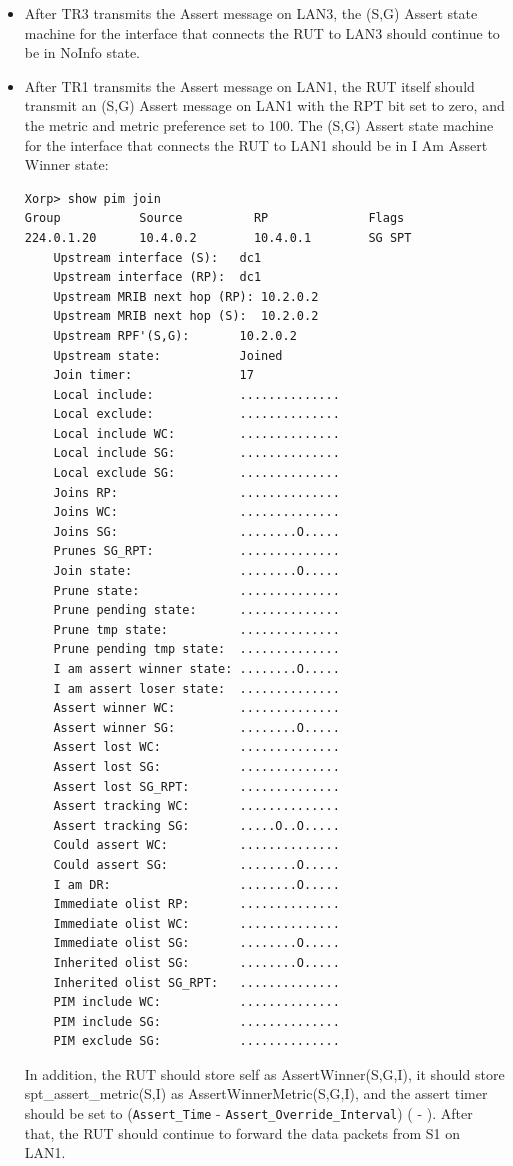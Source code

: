 \documentclass[11pt]{report}
\begin{document}
\begin{itemize}
  \item After TR3 transmits the Assert message on LAN3, the (S,G) Assert state
  machine for the interface that connects the RUT to LAN3 should continue to
  be in NoInfo state.

  \item After TR1 transmits the Assert message on LAN1, the RUT itself should
  transmit an (S,G) Assert message on LAN1 with the RPT bit set to zero,
  and the metric and metric preference set to 100. The (S,G) Assert state
  machine for the interface that connects the RUT to LAN1 should be in I Am
  Assert Winner state:

\begin{verbatim}
Xorp> show pim join 
Group           Source          RP              Flags
224.0.1.20      10.4.0.2        10.4.0.1        SG SPT 
    Upstream interface (S):   dc1
    Upstream interface (RP):  dc1
    Upstream MRIB next hop (RP): 10.2.0.2
    Upstream MRIB next hop (S):  10.2.0.2
    Upstream RPF'(S,G):       10.2.0.2
    Upstream state:           Joined 
    Join timer:               17
    Local include:            ..............
    Local exclude:            ..............
    Local include WC:         ..............
    Local include SG:         ..............
    Local exclude SG:         ..............
    Joins RP:                 ..............
    Joins WC:                 ..............
    Joins SG:                 ........O.....
    Prunes SG_RPT:            ..............
    Join state:               ........O.....
    Prune state:              ..............
    Prune pending state:      ..............
    Prune tmp state:          ..............
    Prune pending tmp state:  ..............
    I am assert winner state: ........O.....
    I am assert loser state:  ..............
    Assert winner WC:         ..............
    Assert winner SG:         ........O.....
    Assert lost WC:           ..............
    Assert lost SG:           ..............
    Assert lost SG_RPT:       ..............
    Assert tracking WC:       ..............
    Assert tracking SG:       .....O..O.....
    Could assert WC:          ..............
    Could assert SG:          ........O.....
    I am DR:                  ........O.....
    Immediate olist RP:       ..............
    Immediate olist WC:       ..............
    Immediate olist SG:       ........O.....
    Inherited olist SG:       ........O.....
    Inherited olist SG_RPT:   ..............
    PIM include WC:           ..............
    PIM include SG:           ..............
    PIM exclude SG:           ..............
\end{verbatim}

  In addition, the RUT should store self as AssertWinner(S,G,I), it should
  store spt\_assert\_metric(S,I) as AssertWinnerMetric(S,G,I), and the assert
  timer should be set to \newline
  (\verb=Assert_Time= - \verb=Assert_Override_Interval=)
  ({\PimsmAssertTime} - {\PimsmAssertOverrideInterval}).
  After that, the RUT should continue to forward the data packets from S1 on
  LAN1.

\end{itemize}
\end{document}
